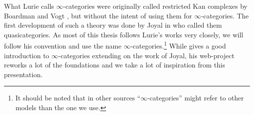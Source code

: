 \documentclass[../../thesis.tex]{subfiles}
\begin{document}
What Lurie \cite{HTT} calls $\infty$-categories were originally called restricted Kan complexes by Boardman and Vogt \cite{BoardmanVogt}, but without the intent of using them for $\infty$-categories.
The first development of such a theory was done by Joyal in \cite{Joyal} who called them quasicategories.
As most of this thesis follows Lurie's works very closely, we will follow his convention and use the name $\infty$-categories.\footnote{It should be noted that in other sources ``$\infty$-categories'' might refer to other models than the one we use.}
While \cite{HTT} gives a good introduction to $\infty$-categories extending on the work of Joyal, his web-project \cite{kerodon} reworks a lot of the foundations and we take a lot of inspiration from this presentation.
\end{document}
